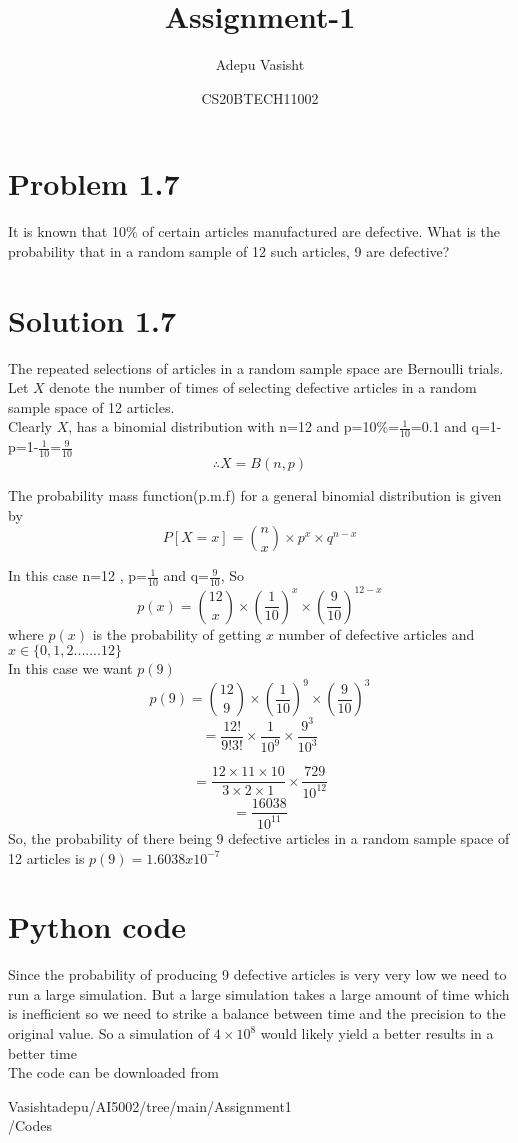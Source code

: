 \documentclass[journal,12pt,twocolumn]{IEEEtran}
\title{Assignment-1}
\author{Adepu Vasisht}
\date{CS20BTECH11002}
\begin{document}
\maketitle

\section*{Problem 1.7}
It is known that 10$\%$ of certain articles manufactured are defective. What is the probability that in a random sample of 12 such articles, 9 are defective?
\section*{Solution 1.7}
The repeated selections of articles in a random sample space are Bernoulli trials. Let $X$ denote the number of times of selecting defective articles in a random sample space of 12 articles.\\

Clearly $X$, has a binomial distribution with n=12 and p=10\%=$\frac{1}{10}$=0.1
and q=1-p=1-$\frac{1}{10}$=$\frac{9}{10}$\\

$$\therefore X = B (n,p)$$

The probability mass function(p.m.f) for a general binomial distribution is given by $$P[X=x]= {n \choose x} \times p^x\times q^{n-x}$$

In this case n=12 , p=$\frac{1}{10}$ and q=$\frac{9}{10}$, So 
$$p(x)={12 \choose x}\times(\frac{1}{10})^x\times(\frac{9}{10})^{12-x}$$
where $p(x)$ is the probability of getting $x$ number of defective articles and $x\in \{0,1,2.......12\}$\\

In this case we want $p(9)$ $$p(9)={12 \choose 9}\times(\frac{1}{10})^9\times(\frac{9}{10})^{3}$$
$$=\frac{12!}{9!3!}\times\frac{1}{10^9}\times\frac{9^3}{10^3}$$

$$=\frac{12\times11\times10}{3\times2\times1}\times\frac{729}{10^12}$$
$$=\frac{16038}{10^{11}}$$
So, the probability of there being 9 defective articles in a random sample space of 12 articles is $p(9)=1.6038x10^{-7}$ 


\section*{Python code}
Since the probability of producing 9 defective articles is very very low we need to run a large simulation. But a large simulation takes a large amount of time which is inefficient so we need to strike a balance between time and the precision to the original value. So a simulation of $4\times10^8$ would likely yield a better results in a better time\\
The code can be downloaded from
\begin{tcolorbox}{
Vasishtadepu/AI5002/tree/main/Assignment1\\/Codes
}
\end{tcolorbox}
\end{document}
